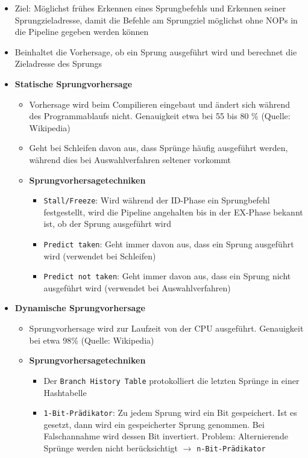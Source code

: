 			\begin{itemize}
				\item Ziel: Möglichst frühes Erkennen eines Sprungbefehls und Erkennen seiner Sprungzieladresse, damit die Befehle am Sprungziel möglichst ohne NOPs in die Pipeline gegeben werden können
				\item Beinhaltet die Vorhersage, ob ein Sprung ausgeführt wird und berechnet die Zieladresse des Sprungs
				\item \textbf{Statische Sprungvorhersage}
				\begin{itemize}
					\item Vorhersage wird beim Compilieren eingebaut und ändert sich während des Programmablaufs nicht. Genauigkeit etwa bei 55 bis 80 \% (Quelle: Wikipedia)
					\item Geht bei Schleifen davon aus, dass Sprünge häufig ausgeführt werden, während dies bei Auswahlverfahren seltener vorkommt
					\item \textbf{Sprungvorhersagetechniken}
					\begin{itemize}
						\item \texttt{Stall/Freeze}: Wird während der ID-Phase ein Sprungbefehl festgestellt, wird die Pipeline angehalten bis in der EX-Phase bekannt ist, ob der Sprung ausgeführt wird
						\item \texttt{Predict taken}: Geht immer davon aus, dass ein Sprung ausgeführt wird (verwendet bei Schleifen)
						\item \texttt{Predict not taken}: Geht immer davon aus, dass ein Sprung nicht ausgeführt wird (verwendet bei Auswahlverfahren)
					\end{itemize}
				\end{itemize}
				\item \textbf{Dynamische Sprungvorhersage}
				\begin{itemize}
					\item Sprungvorhersage wird zur Laufzeit von der CPU ausgeführt. Genauigkeit bei etwa 98\% (Quelle: Wikipedia)
					\item \textbf{Sprungvorhersagetechniken}
					\begin{itemize}
						\item Der \texttt{Branch History Table} protokolliert die letzten Sprünge in einer Hashtabelle
						\item \texttt{1-Bit-Prädikator}: Zu jedem Sprung wird ein Bit gespeichert. Ist es gesetzt, dann wird ein gespeicherter Sprung genommen. Bei Falschannahme wird dessen Bit invertiert. Problem: Alternierende Sprünge werden nicht berücksichtigt \(\rightarrow\) \texttt{n-Bit-Prädikator}

\end{itemize}
\end{itemize}
\end{itemize}
